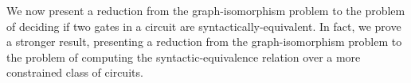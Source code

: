 \documentclass[../paper.tex]{subfiles}
\begin{document}


We now present a reduction from the graph-isomorphism problem to the problem of
deciding if two gates in a circuit are syntactically-equivalent. In fact, we
prove a stronger result, presenting a reduction from the graph-isomorphism
problem to the problem of computing the syntactic-equivalence relation over a
more constrained class of circuits.
\end{document}
